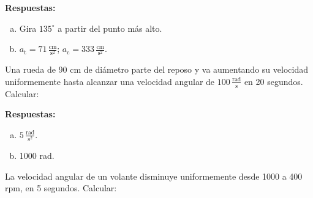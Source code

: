 \documentclass[addpoints]{exam}
\newcommand{\grado}[0]{^{\circ}}
\newcommand{\rtas}{\textbf{Respuestas: }}
\begin{document}
\begin{questions}

    \rtas 
    \begin{enumerate}[(a)]
        \item Gira $135\grado$ a partir del punto más alto.
        \item $a_\text{t} = 71 \, \frac{\text{cm}}{\text{s}^2}$; $a_\text{c} = 333 \, \frac{\text{cm}}{\text{s}^2}$.
    \end{enumerate}

    \question Una rueda de 90 cm de diámetro parte del reposo y va aumentando su velocidad uniformemente hasta alcanzar una velocidad angular de $100 \, \frac{\text{rad}}{\text{s}}$ en 20 segundos. Calcular:

    \rtas
    \begin{enumerate}[(a)]
        \item $5 \, \frac{\text{rad}}{\text{s}^2}$.
        \item 1000 rad.
    \end{enumerate}

    \question La velocidad angular de un volante disminuye uniformemente desde 1000 a 400 rpm, en 5 segundos. Calcular:


\end{questions}
\end{document}
